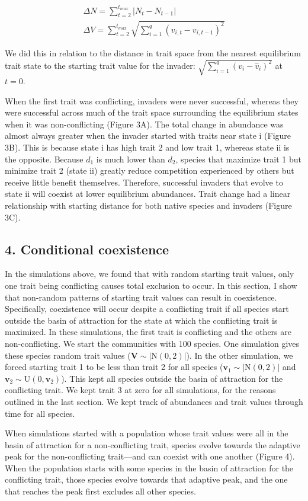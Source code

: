 \begin{align}
\Delta N = \sum_{t=2}^{t_{max}}{ | N_{t} - N_{t-1} | } \\
\Delta V = \sum_{t=2}^{t_{max}}{\sqrt{\sum_{i = 1}^{q}{(v_{i,t} - v_{i,t-1})^2}}}
\end{align}

\noindent We did this in relation to the distance in trait space from
the nearest equilibrium trait state to the starting trait value for the invader:
$\sqrt{\sum_{i = 1}^{q}{(v_{i} - \hat{v}_{i})^2}}$ at $t = 0$.


When the first trait was conflicting, invaders were never successful,
whereas they were successful across much of the trait space surrounding the
equilibrium states when it was non-conflicting (Figure 3A).
The total change in abundance was almost always greater when the invader
started  with traits near state i (Figure 3B).
This is because state i has high trait 2 and low trait 1, whereas
state ii is the opposite.
Because $d_1$ is much lower than $d_2$, species that maximize trait 1
but minimize trait 2 (state ii) greatly reduce competition experienced by
others but receive little benefit themselves.
Therefore, successful invaders that evolve to state ii will coexist at lower
equilibrium abundances.
Trait change had a linear relationship with starting distance for both
native species and invaders (Figure 3C).



\subsection*{4. Conditional coexistence}

In the simulations above, we found that with random starting trait values,
only one trait being conflicting causes total exclusion to occur.
In this section, I show that non-random patterns of starting trait values
can result in coexistence.
Specifically, coexistence will occur despite a conflicting trait if all
species start outside the basin of attraction for the state at which
the conflicting trait is maximized.
In these simulations, the first trait is conflicting and the others
are non-conflicting.
We start the communities with 100 species.
One simulation gives these species random trait values
($\mathbf{V} \sim |\text{N}(0,2)|$).
In the other simulation, we forced starting trait 1 to be less than trait 2
for all species ($\mathbf{v}_1 \sim |\text{N}(0,2)|$ and
$\mathbf{v}_2 \sim \text{U}(0, \mathbf{v}_2)$).
This kept all species outside the basin of attraction for the conflicting trait.
We kept trait 3 at zero for all simulations, for the reasons outlined in
the last section.
We kept track of abundances and trait values through time for all species.



When simulations started with a population whose trait values were all in the
basin of attraction for a non-conflicting trait, species evolve towards the
adaptive peak for the non-conflicting trait---and can coexist with one another
(Figure 4).
When the population starts with some species in the basin of attraction for
the conflicting trait, those species evolve towards that adaptive peak, and
the one that reaches the peak first excludes all other species.
